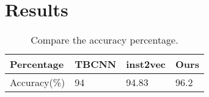 \documentclass[a4paper,twoside]{iiththesis}
\begin{document}





\section{Results}

\begin{table}[h]


\begin{tabular}{l l l l}
\hline
Percentage & TBCNN & inst2vec &  Ours\\
\hline
Accuracy(\%) & 94 & 94.83 & 96.2 \\
\hline
\end{tabular}
\centering
\caption{Compare the accuracy percentage.}
\label{tab-acc}
\end{table}
\end{document}
